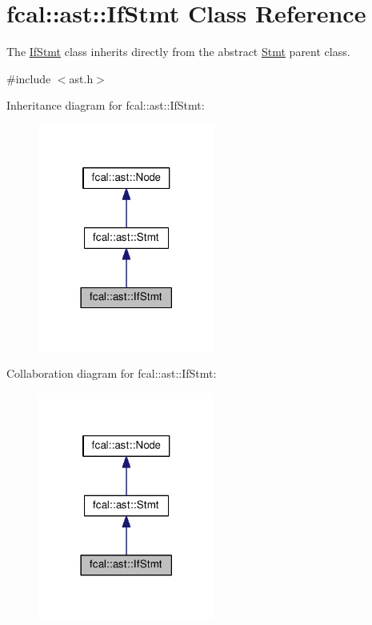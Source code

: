 \hypertarget{classfcal_1_1ast_1_1IfStmt}{}\section{fcal\+:\+:ast\+:\+:If\+Stmt Class Reference}
\label{classfcal_1_1ast_1_1IfStmt}


The \hyperlink{classfcal_1_1ast_1_1IfStmt}{If\+Stmt} class inherits directly from the abstract \hyperlink{classfcal_1_1ast_1_1Stmt}{Stmt} parent class.  




{\ttfamily \#include $<$ast.\+h$>$}



Inheritance diagram for fcal\+:\+:ast\+:\+:If\+Stmt\+:
\nopagebreak
\begin{figure}[H]
\begin{center}
\leavevmode
\includegraphics[width=165pt]{classfcal_1_1ast_1_1IfStmt__inherit__graph}
\end{center}
\end{figure}


Collaboration diagram for fcal\+:\+:ast\+:\+:If\+Stmt\+:
\nopagebreak
\begin{figure}[H]
\begin{center}
\leavevmode
\includegraphics[width=165pt]{classfcal_1_1ast_1_1IfStmt__coll__graph}
\end{center}
\end{figure}
